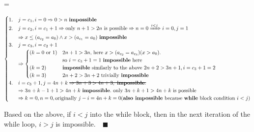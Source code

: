 \documentclass{article}
\newcommand\hcancel[2][black]{\setbox0=\hbox{$#2$}%
\rlap{\raisebox{.45\ht0}{\textcolor{#1}{\rule{\wd0}{1pt}}}}{#2}}
\edef\mylb{\\}
\newenvironment{CondensedCases}{%



\everydisplay=\expandafter{\the\everydisplay\setstretch{0.9}}

  \par\vspace{-5ex}%
  $$\displaystyle\begin{cases}
}{
  \end{cases}$$
  \par\vspace{-2ex}%
  \renewcommand{\\}{\mylb}
}
\begin{document}
\begin{todolist}[itemsep=0pt,parsep=0pt,start=3]
\begin{itemize}
              \begin{CondensedCases}
                  1. & j=c_1,i=0\Rightarrow 0>n\text{ \textbf{impossible}}                                                                          \\
                  2. & j=c_2,i=c_1+1\Rightarrow \text{only }n+1>2n\text{ is possible}
                  \Rightarrow n=0\xRightarrow{i<j}i=0,j=1                                                                                           \\
                  & \Rightarrow x\le (a_{c_2}=a_0)\wedge x>(a_{c_1}=a_0)\text{ \textbf{impossible}}                                              \\
                  3. & j=c_3,i=c_2+1                                                                                                                \\
                  & \Rightarrow\begin{cases}
                      (k=0\text{ or }1) & 2n+1>3n\text{, here } x>(a_{c_2}=a_{c_3})(x>a_0)\text{.}              \\
                                        & \text{so }i=c_3+1=1\text{ \textbf{impossible} here}                   \\
                      (k=2)             & \text{\textbf{impossible} similarly to the above }2n+2>3n+1,i=c_3+1=2 \\
                      (k=3)             & 2n+2>3n+2\text{ trivially \textbf{impossible}}
                  \end{cases}                     \\
                  4. & i=c_3+1,j=4n+k\;\hcancel{\Rightarrow 3n+3>4n+3,\text{ \textbf{impossible}.}}                                                 \\
                  & \Rightarrow 3n+k-1+1>4n+k\text{ \textbf{impossible}.}\text{ only } 3n+k+1>4n+k\text{ is possible}                            \\
                  & \Rightarrow k=0,n=0,\text{originally }j-i=4n+k=0(\text{\textbf{also impossible} because \textbf{while} block condition }i<j)
              \end{CondensedCases}

              Based on the above, if $i<j$ into the while block,
              then in the next iteration of the while loop, $i>j$ is impossible.$\quad\blacksquare$
    \end{itemize}


\end{todolist}
\end{document}

